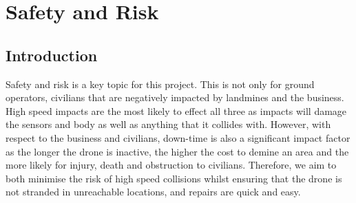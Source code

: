 \section{Safety and Risk}\label{Safety and Risk}
\subsection{Introduction}\label{sub_section:tgt_safety_intro}
Safety and risk is a key topic for this project. This is not only for ground operators, civilians that are negatively impacted by landmines and the business. High speed impacts are the most likely to effect all three as impacts will damage the sensors and body as well as anything that it collides with. However, with respect to the business and civilians, down-time is also a significant impact factor as the longer the drone is inactive, the higher the cost to demine an area and the more likely for injury, death and obstruction to civilians. Therefore, we aim to both minimise the risk of high speed collisions whilst ensuring that the drone is not stranded in unreachable locations, and repairs are quick and easy.


